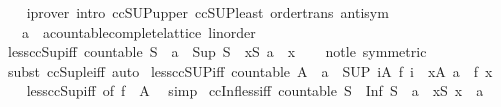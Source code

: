 \begin{isabellebody}
%
\isadelimproof
\ \ %
\endisadelimproof
%
\isatagproof
{}\isamarkupfalse%
\ {\isacharparenleft}iprover\ intro{\isacharcolon}\ ccSUP{\isacharunderscore}upper\ ccSUP{\isacharunderscore}least\ order{\isacharunderscore}trans\ antisym{\isacharparenright}%
\endisatagproof
{\isafoldproof}%
%
\isadelimproof
\isanewline
%
\endisadelimproof
\isanewline
{}\isamarkupfalse%
\isanewline
\isanewline
{}\isamarkupfalse%
\isanewline
\ \ \ a\ {\isacharcolon}{\isacharcolon}\ {\isachardoublequoteopen}{\isacharprime}a{\isacharcolon}{\isacharcolon}{\isacharbraceleft}countable{\isacharunderscore}complete{\isacharunderscore}lattice{\isacharcomma}\ linorder{\isacharbraceright}{\isachardoublequoteclose}\isanewline
{}\isanewline
\isanewline
{}\isamarkupfalse%
\ less{\isacharunderscore}ccSup{\isacharunderscore}iff{\isacharcolon}\ {\isachardoublequoteopen}countable\ S\ {\isasymLongrightarrow}\ a\ {\isacharless}\ Sup\ S\ {\isasymlongleftrightarrow}\ {\isacharparenleft}{\isasymexists}x{\isasymin}S{\isachardot}\ a\ {\isacharless}\ x{\isacharparenright}{\isachardoublequoteclose}\isanewline
%
\isadelimproof
\ \ %
\endisadelimproof
%
\isatagproof
{}\isamarkupfalse%
\ not{\isacharunderscore}le\ {\isacharbrackleft}symmetric{\isacharbrackright}\ \isamarkupfalse%
\ {\isacharparenleft}subst\ ccSup{\isacharunderscore}le{\isacharunderscore}iff{\isacharparenright}\ auto%
\endisatagproof
{\isafoldproof}%
%
\isadelimproof
\isanewline
%
\endisadelimproof
\isanewline
{}\isamarkupfalse%
\ less{\isacharunderscore}ccSUP{\isacharunderscore}iff{\isacharcolon}\ {\isachardoublequoteopen}countable\ A\ {\isasymLongrightarrow}\ a\ {\isacharless}\ {\isacharparenleft}SUP\ i{\isacharcolon}A{\isachardot}\ f\ i{\isacharparenright}\ {\isasymlongleftrightarrow}\ {\isacharparenleft}{\isasymexists}x{\isasymin}A{\isachardot}\ a\ {\isacharless}\ f\ x{\isacharparenright}{\isachardoublequoteclose}\isanewline
%
\isadelimproof
\ \ %
\endisadelimproof
%
\isatagproof
{}\isamarkupfalse%
\ less{\isacharunderscore}ccSup{\isacharunderscore}iff\ {\isacharbrackleft}of\ {\isachardoublequoteopen}f\ {\isacharbackquote}\ A{\isachardoublequoteclose}{\isacharbrackright}\ \isamarkupfalse%
\ simp%
\endisatagproof
{\isafoldproof}%
%
\isadelimproof
\isanewline
%
\endisadelimproof
\isanewline
{}\isamarkupfalse%
\ ccInf{\isacharunderscore}less{\isacharunderscore}iff{\isacharcolon}\ {\isachardoublequoteopen}countable\ S\ {\isasymLongrightarrow}\ Inf\ S\ {\isacharless}\ a\ {\isasymlongleftrightarrow}\ {\isacharparenleft}{\isasymexists}x{\isasymin}S{\isachardot}\ x\ {\isacharless}\ a{\isacharparenright}{\isachardoublequoteclose}\isanewline

\end{isabellebody}
